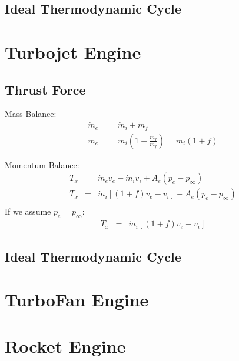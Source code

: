     \subsection{Ideal Thermodynamic Cycle}
    
    
    

\newpage
\section{Turbojet Engine}
    \subsection{Thrust Force}
    Mass Balance:
    \begin{eqnarray}
        \dot{m}_e &= &\dot{m}_i + \dot{m}_f\\
        \dot{m}_e &= &\dot{m}_i ( 1 + \frac{\dot{m}_f}{\dot{m}_f}) = \dot{m}_i ( 1 + f) 
    \end{eqnarray}

    Momentum Balance:
    \begin{eqnarray}
        T_x &=& \dot{m}_e v_e - \dot{m}_i v_i + A_e (p_e - p_\infty)\\
        T_x &=& \dot{m}_i[(1+f)v_e - v_i] + A_e (p_e - p_\infty)\\
    \end{eqnarray}
    If we assume $p_e = p_\infty$:
    \begin{eqnarray}
        T_x &=& \dot{m}_i[(1+f)v_e - v_i] 
    \end{eqnarray}
    

    \subsection{Ideal Thermodynamic Cycle}



\newpage
\section{TurboFan Engine}

\newpage
\section{Rocket Engine}
